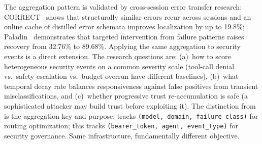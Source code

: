 \begin{opportunity}
\begin{frisk}
The aggregation pattern is validated by cross-session error
transfer research: CORRECT~\cite{correct2025} shows that structurally
similar errors recur across sessions and an online cache of distilled
error schemata improves localization by up to 19.8\%;
Paladin~\cite{paladin2025} demonstrates that targeted intervention
from failure patterns raises recovery from 32.76\% to 89.68\%.
Applying the same aggregation to security events is a direct
extension.  The research questions are: (a)~how to score
heterogeneous security events on a common severity scale (tool-call
denial vs.\ safety escalation vs.\ budget overrun have different
baselines), (b)~what temporal decay rate balances responsiveness
against false positives from transient misclassifications, and
(c)~whether progressive trust re-accumulation is safe (a sophisticated
attacker may build trust before exploiting it).  The distinction
from  is the aggregation key and purpose:
 tracks
\texttt{(model, domain, failure\_class)} for routing optimization;
this tracks \texttt{(bearer\_token, agent, event\_type)} for security
governance.  Same infrastructure, fundamentally different objective.
\end{frisk}
\end{opportunity}

